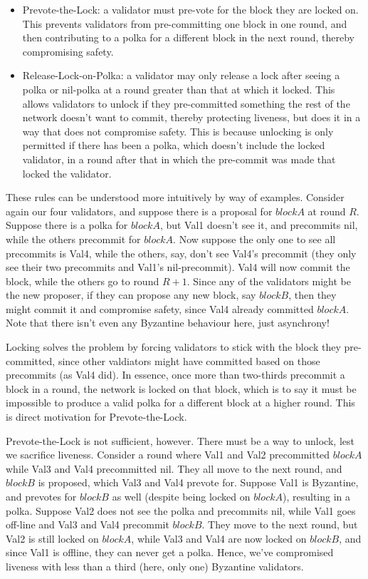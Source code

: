\begin{itemize}
\item{Prevote-the-Lock: a validator must pre-vote for the block they are locked on. 
	This prevents validators from pre-committing one block in one round, 
	and then contributing to a polka for a different block in the next round, 
	thereby compromising safety.}
\item{Release-Lock-on-Polka: a validator may only release a lock after seeing a polka or nil-polka at a round greater than that at which it locked.
	This allows validators to unlock if they pre-committed something the rest of the network doesn't want to commit,
	thereby protecting liveness, but does it in a way that does not compromise safety.
	This is because unlocking is only permitted if there has been a polka, which doesn't include the locked validator,
	in a round after that in which the pre-commit was made that locked the validator.}
\end{itemize}


These rules can be understood more intuitively by way of examples. 
Consider again our four validators, and suppose there is a proposal for $blockA$ at round $R$. 
Suppose there is a polka for $blockA$, but Val1 doesn't see it, and precommits nil, while the others precommit for $blockA$.
Now suppose the only one to see all precommits is Val4, while the others, say, don't see Val4's precommit (they only see their two precommits and Val1's nil-precommit).
Val4 will now commit the block, while the others go to round $R+1$.
Since any of the validators might be the new proposer, if they can propose any new block, say $blockB$, then they might commit it and compromise safety, since Val4 already committed $blockA$.
Note that there isn't even any Byzantine behaviour here, just asynchrony!

Locking solves the problem by forcing validators to stick with the block they pre-committed, since other valdiators might have committed based on those precommits (as Val4 did).
In essence, once more than two-thirds precommit a block in a round, the network is locked on that block,
which is to say it must be impossible to produce a valid polka for a different block at a higher round.
This is direct motivation for Prevote-the-Lock.

Prevote-the-Lock is not sufficient, however. There must be a way to unlock, lest we sacrifice liveness.
Consider a round where Val1 and Val2 precommitted $blockA$ while Val3 and Val4 precommitted nil.
They all move to the next round, and $blockB$ is proposed, which Val3 and Val4 prevote for.
Suppose Val1 is Byzantine, and prevotes for $blockB$ as well (despite being locked on $blockA$), resulting in a polka.
Suppose Val2 does not see the polka and precommits nil, while Val1 goes off-line and Val3 and Val4 precommit $blockB$. 
They move to the next round, but Val2 is still locked on $blockA$, while Val3 and Val4 are now locked on $blockB$, 
and since Val1 is offline, they can never get a polka. Hence, we've compromised liveness with less than a third (here, only one) Byzantine validators.

